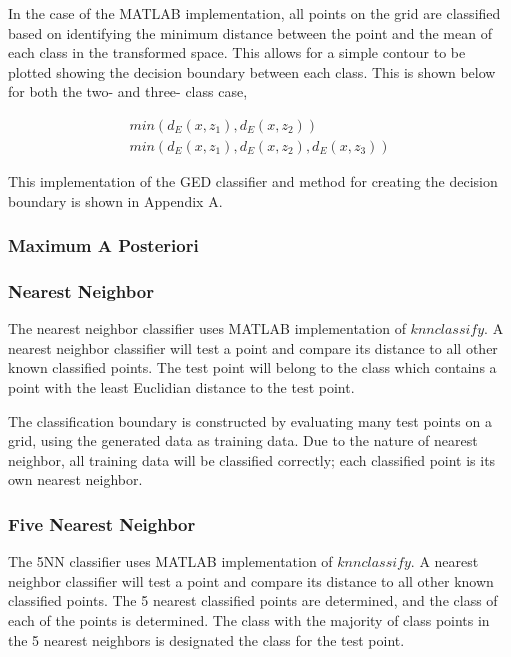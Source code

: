 In the case of the MATLAB implementation, all points on the grid are classified based on identifying the minimum distance between the point and the mean of each class in the transformed space. This allows for a simple contour to be plotted showing the decision boundary between each class. This is shown below for both the two- and three- class case,

\begin{eqnarray}
\label{eqn:pointClass-GED}
min(d_{E} (x,z_{1}), d_{E} (x,z_{2})) \\
min(d_{E} (x,z_{1}), d_{E} (x,z_{2}), d_{E} (x,z_{3}))
\end{eqnarray}


This implementation of the GED classifier and method for creating the decision boundary is shown in Appendix A.

\subsubsection{Maximum A Posteriori}

\subsubsection{Nearest Neighbor}

The nearest neighbor classifier uses MATLAB implementation of $knnclassify$. A nearest neighbor classifier will test a point and compare its distance to all other known classified points. The test point will belong to the class which contains a point with the least Euclidian distance to the test point.

The classification boundary is constructed by evaluating many test points on a grid, using the generated data as training data. Due to the nature of nearest neighbor, all training data will be classified correctly; each classified point is its own nearest neighbor.

\subsubsection{Five Nearest Neighbor}

The 5NN classifier uses MATLAB implementation of $knnclassify$. A nearest neighbor classifier will test a point and compare its distance to all other known classified points. The 5 nearest classified points are determined, and the class of each of the points is determined. The class with the majority of class points in the 5 nearest neighbors is designated the class for the test point.

